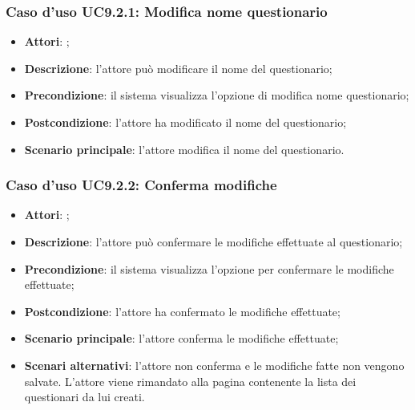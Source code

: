 		\subsubsection{Caso d'uso UC9.2.1: Modifica nome questionario}
		\label{UC9.2.1}
		\begin{itemize}
			\item \textbf{Attori}: \uaupro{};
			\item \textbf{Descrizione}: l'attore può modificare il nome del questionario; 
			\item \textbf{Precondizione}: il sistema visualizza l'opzione di modifica nome questionario;
			\item \textbf{Postcondizione}: l'attore ha modificato il nome del questionario; 
			\item \textbf{Scenario principale}: l'attore modifica il nome del questionario.
		\end{itemize}
																		
		\subsubsection{Caso d'uso UC9.2.2: Conferma modifiche}
		\label{UC9.2.2}
		\begin{itemize}
			\item \textbf{Attori}: \uaupro{};
			\item \textbf{Descrizione}: l'attore può confermare le modifiche effettuate al questionario;
			\item \textbf{Precondizione}: il sistema visualizza l'opzione per confermare le modifiche effettuate;
			\item \textbf{Postcondizione}: l'attore ha confermato le modifiche effettuate;
			\item \textbf{Scenario principale}: l'attore conferma le modifiche effettuate;
			\item \textbf{Scenari alternativi}: l'attore non conferma e le modifiche fatte non vengono salvate. L'attore viene rimandato alla pagina contenente la lista dei questionari da lui creati.
		\end{itemize}
									
